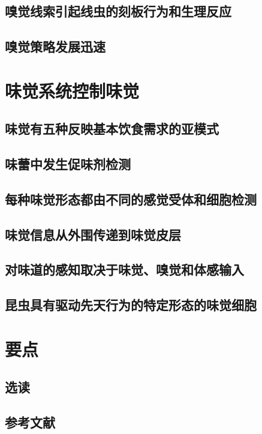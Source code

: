 \subsection{嗅觉线索引起线虫的刻板行为和生理反应}
\subsection{嗅觉策略发展迅速}

\section{味觉系统控制味觉}
\subsection{味觉有五种反映基本饮食需求的亚模式}
\subsection{味蕾中发生促味剂检测}
\subsection{每种味觉形态都由不同的感觉受体和细胞检测}
\subsection{味觉信息从外围传递到味觉皮层}
\subsection{对味道的感知取决于味觉、嗅觉和体感输入}
\subsection{昆虫具有驱动先天行为的特定形态的味觉细胞}

\section{要点}
\subsection{选读}
\subsection{参考文献}